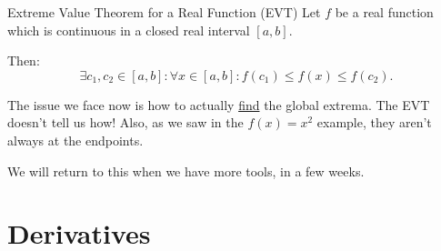 \begin{Theorem}{Extreme Value Theorem for a Real Function (EVT)}{}
    Let $ f $ be a real function which is continuous in a closed real interval $ [a,b] $.

    Then:
    \[ \exists c_1,c_2\in[a,b]:\forall x\in[a,b]: f(c_1)\le f(x)\le f(c_2). \]
\end{Theorem}
The issue we face now is how to actually \underline{find} the global extrema.
The EVT doesn't tell us how! Also, as we saw in the $ f(x)=x^2 $
example, they aren't always at the endpoints.

We will return to this when we have more tools, in a few weeks.

\chapter{Derivatives}
